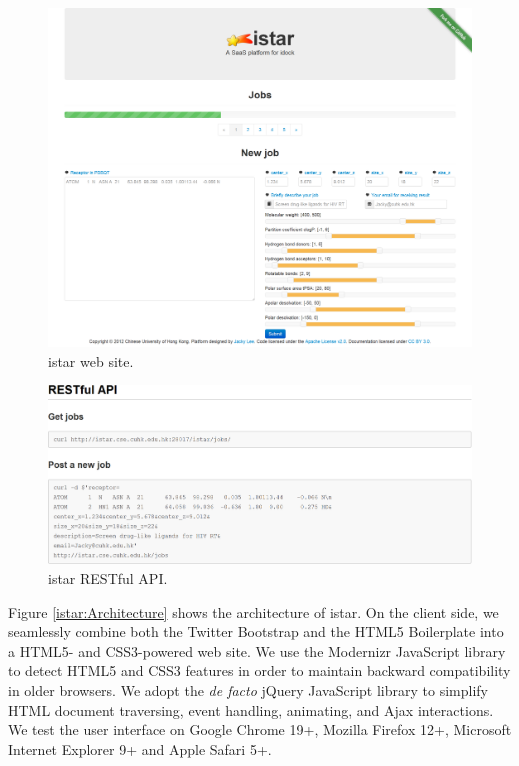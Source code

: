 \begin{figure}
\centering
\includegraphics[width=\linewidth]{istar/Website.png}
\caption{istar web site.}
\label{istar:Website}
\end{figure}

\begin{figure}
\centering
\includegraphics[width=\linewidth]{istar/RESTfulAPI.png}
\caption{istar RESTful API.}
\label{istar:RESTfulAPI}
\end{figure}

Figure \ref{istar:Architecture} shows the architecture of istar. On the client side, we seamlessly combine both the Twitter Bootstrap and the HTML5 Boilerplate into a HTML5- and CSS3-powered web site. We use the Modernizr JavaScript library to detect HTML5 and CSS3 features in order to maintain backward compatibility in older browsers. We adopt the \textit{de facto} jQuery JavaScript library to simplify HTML document traversing, event handling, animating, and Ajax interactions. We test the user interface on Google Chrome 19+, Mozilla Firefox 12+, Microsoft Internet Explorer 9+ and Apple Safari 5+.

